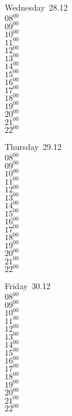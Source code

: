\documentclass[11pt,a4paper]{book}\usepackage[]{graphicx}\usepackage[]{color}
\begin{document}
\begin{weekdaybox}
  Wednesday~28.12\\
  { 
  \vfill
  $08^{00}$\\
$09^{00}$\\
$10^{00}$\\
$11^{00}$\\
$12^{00}$\\
$13^{00}$\\
$14^{00}$\\
$15^{00}$\\
$16^{00}$\\
$17^{00}$\\
$18^{00}$\\
$19^{00}$\\
$20^{00}$\\
$21^{00}$\\
$22^{00}$\\
  }
\end{weekdaybox}
\clearpage
\begin{headerbox}
\end{headerbox}
\begin{weekdaybox}
  Thursday~29.12\\
  { 
  \vfill
  $08^{00}$\\
$09^{00}$\\
$10^{00}$\\
$11^{00}$\\
$12^{00}$\\
$13^{00}$\\
$14^{00}$\\
$15^{00}$\\
$16^{00}$\\
$17^{00}$\\
$18^{00}$\\
$19^{00}$\\
$20^{00}$\\
$21^{00}$\\
$22^{00}$\\
  }
\end{weekdaybox} 
\begin{weekdaybox}
  Friday~30.12\\
  { 
  \vfill
  $08^{00}$\\
$09^{00}$\\
$10^{00}$\\
$11^{00}$\\
$12^{00}$\\
$13^{00}$\\
$14^{00}$\\
$15^{00}$\\
$16^{00}$\\
$17^{00}$\\
$18^{00}$\\
$19^{00}$\\
$20^{00}$\\
$21^{00}$\\
$22^{00}$\\
  }
\end{weekdaybox}
\end{document}
